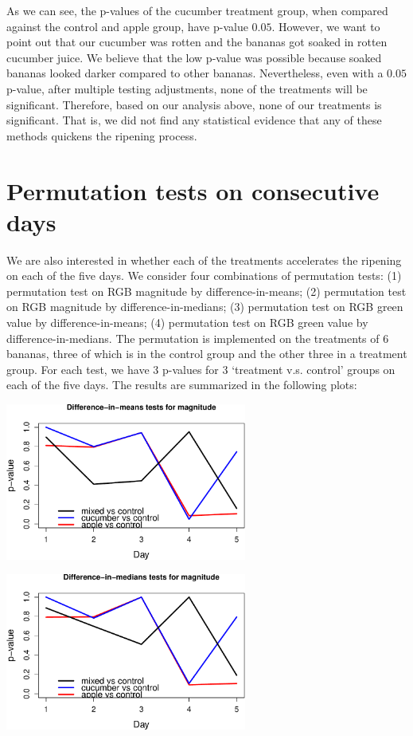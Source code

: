 \documentclass[
  12pt,
]{article}
\begin{document}
As we can see, the p-values of the cucumber treatment group, when
compared against the control and apple group, have p-value \(0.05\).
However, we want to point out that our cucumber was rotten and the
bananas got soaked in rotten cucumber juice. We believe that the low
p-value was possible because soaked bananas looked darker compared to
other bananas. Nevertheless, even with a \(0.05\) p-value, after
multiple testing adjustments, none of the treatments will be
significant. Therefore, based on our analysis above, none of our
treatments is significant. That is, we did not find any statistical
evidence that any of these methods quickens the ripening process.

\hypertarget{permutation-tests-on-consecutive-days}{%
\section{Permutation tests on consecutive
days}\label{permutation-tests-on-consecutive-days}}

We are also interested in whether each of the treatments accelerates the
ripening on each of the five days. We consider four combinations of
permutation tests: (1) permutation test on RGB magnitude by
difference-in-means; (2) permutation test on RGB magnitude by
difference-in-medians; (3) permutation test on RGB green value by
difference-in-means; (4) permutation test on RGB green value by
difference-in-medians. The permutation is implemented on the treatments
of 6 bananas, three of which is in the control group and the other three
in a treatment group. For each test, we have 3 p-values for 3 `treatment
v.s. control' groups on each of the five days. The results are
summarized in the following plots:

\includegraphics[width=300px]{report_files/figure-latex/unnamed-chunk-14-1}

\includegraphics[width=300px]{report_files/figure-latex/unnamed-chunk-15-1}
\end{document}
